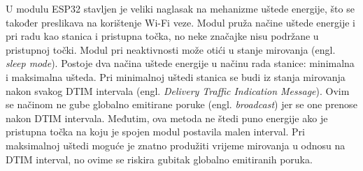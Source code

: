 U modulu ESP32 stavljen je veliki naglasak na mehanizme uštede energije, što se također preslikava na korištenje Wi-Fi veze. Modul pruža načine uštede energije i pri radu kao stanica i pristupna točka, no neke značajke nisu podržane u pristupnoj točki. Modul pri neaktivnosti može otići u stanje mirovanja (engl. \textit{sleep mode}). Postoje dva načina uštede energije u načinu rada stanice: minimalna i maksimalna ušteda. Pri minimalnoj uštedi stanica se budi iz stanja mirovanja nakon svakog DTIM intervala (engl. \textit{Delivery Traffic Indication Message}). Ovim se načinom ne gube globalno emitirane poruke (engl. \textit{broadcast}) jer se one prenose nakon DTIM intervala. Međutim, ova metoda ne štedi puno energije ako je pristupna točka na koju je spojen modul postavila malen interval. Pri maksimalnoj uštedi moguće je znatno produžiti vrijeme mirovanja u odnosu na DTIM interval, no ovime se riskira gubitak globalno emitiranih poruka. 

\eject